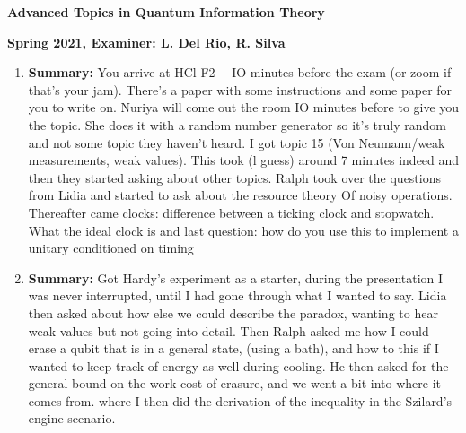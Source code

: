 \documentclass{article}%
\begin{document}
%
\normalsize%
\begin{center}%
\begin{Large}%
\textbf{Advanced Topics in Quantum Information Theory}%
\end{Large}%
\linebreak%
\end{center}%
\begin{center}%
\begin{large}%
\textbf{Spring 2021, Examiner: L. Del Rio, R. Silva}%
\end{large}%
\end{center}%
\begin{enumerate}%
\item%
\begin{mycolorbox}%
\textbf{Summary:}%
\newline%
You arrive at HCl F2 —IO minutes before the exam (or zoom if that's your jam). There's a paper with some instructions and some paper for you to write on.\newline%
Nuriya will come out the room IO minutes before to give you the topic. She does it with a random number generator so it's truly random and not some topic they haven't heard.\newline%
I got topic 15 (Von Neumann/weak measurements, weak values). This took (l guess) around 7 minutes indeed and then they started asking about other topics.\newline%
Ralph took over the questions from Lidia and started to ask about the resource theory Of noisy operations. Thereafter came clocks: difference between a ticking clock and stopwatch. What the ideal clock is and last question: how do you use this to implement a unitary conditioned on timing%
\end{mycolorbox}%
\item%
\textbf{Summary:}%
\newline%
Got Hardy's experiment as a starter, during the presentation I was never interrupted, until I had gone through what I wanted to say. Lidia then asked about how else we could describe the paradox, wanting to hear weak values but not going into detail.\newline%
Then Ralph asked me how I could erase a qubit that is in a general state, (using a bath), and how to this if I wanted to keep track of energy as well during cooling. He then asked for the general bound on the work cost of erasure, and we went a bit into where it comes from. where I then did the derivation of the inequality in the Szilard's engine scenario. \newline%

\end{enumerate}
\end{document}
